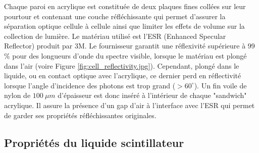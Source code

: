 Chaque paroi en acrylique est constituée de deux plaques fines collées sur leur pourtour et contenant une couche réfléchissante qui permet d'assurer la séparation optique cellule à cellule ainsi que limiter les effets de volume sur la collection de lumière. Le matériau utilisé est l'ESR (Enhanced Specular Reflector) produit par 3M. Le fournisseur garantit une réflexivité supérieure à 99 \% pour des longueurs d'onde du spectre visible, lorsque le matériau est plongé dans l'air (voire Figure \ref{fig:cell_reflectivity.jpg}). Cependant, plongé dans le liquide, ou en contact optique avec l'acrylique, ce dernier perd en réflectivité lorsque l'angle d'incidence des photons est trop grand ($> 60^{\circ}$). Un fin voile de nylon de $\SI{100}{\mu m}$ d'épaisseur est donc inséré à l'intérieur de chaque "sandwich" acrylique. Il assure la présence d'un gap d'air à l'interface avec l'ESR qui permet de garder ses propriétés réfléchissantes originales.\\ 


\bigbreak 

\subsection{Propriétés du liquide scintillateur} 

